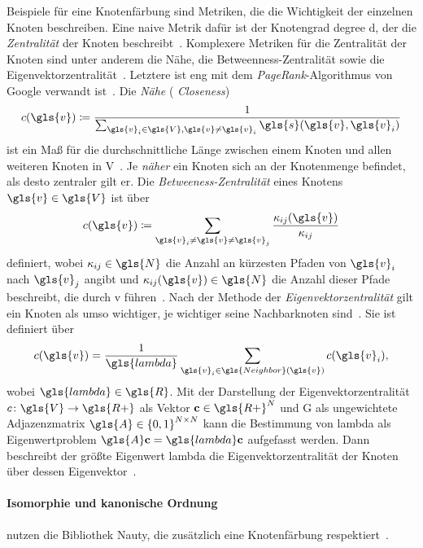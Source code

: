 Beispiele für eine Knotenfärbung sind Metriken, die die Wichtigkeit der einzelnen Knoten beschreiben.
Eine naive Metrik dafür ist \zB{} der Knotengrad \gls{degree} \bzw{} \gls{d}, der die \emph{Zentralität} der Knoten beschreibt~\cite{patchy}.
Komplexere Metriken für die Zentralität der Knoten sind unter anderem die Nähe, die Betweenness-Zentralität sowie die Eigenvektorzentralität~\cite{patchy, centrality}.
Letztere ist eng mit dem \emph{PageRank}-Algorithmus von Google verwandt ist~\cite{centrality}.
Die \emph{Nähe} (\engl{} \emph{Closeness})
\begin{equation*}
  c\left(\gls{v}\right) \coloneqq \frac{1}{\sum_{\gls{v}_i \in \gls{V}, \gls{v} \neq \gls{v}_i} \gls{s}\left(\gls{v}, \gls{v}_i\right)}
\end{equation*}
ist ein Maß für die durchschnittliche Länge zwischen einem Knoten und allen weiteren Knoten in \gls{V}~\cite{centrality}.
Je \emph{näher} ein Knoten sich an der Knotenmenge befindet, als desto zentraler gilt er.
Die \emph{Betweeness-Zentralität} eines Knotens $\gls{v} \in \gls{V}$ ist über
\begin{equation*}
  c\left(\gls{v}\right) \coloneqq \sum_{\gls{v}_i \neq \gls{v} \neq \gls{v}_j} \frac{\kappa_{ij}\left(\gls{v}\right)}{\kappa_{ij}}
\end{equation*}
definiert, wobei $\kappa_{ij} \in \gls{N}$ die Anzahl an kürzesten Pfaden von $\gls{v}_i$ nach $\gls{v}_j$ angibt und $\kappa_{ij}\left(\gls{v}\right) \in \gls{N}$ die Anzahl dieser Pfade beschreibt, die durch \gls{v} führen~\cite{centrality}.
Nach der Methode der \emph{Eigenvektorzentralität} gilt ein Knoten als umso wichtiger, je wichtiger seine Nachbarknoten sind~\cite{centrality}.
Sie ist definiert über
\begin{equation*}
  c\left(\gls{v}\right) = \frac{1}{\gls{lambda}} \sum_{\gls{v}_i \in \gls{Neighbor}\left(\gls{v}\right)} c\left(\gls{v}_i\right),
\end{equation*}
wobei $\gls{lambda} \in \gls{R}$.
Mit der Darstellung der Eigenvektorzentralität $c \colon \gls{V} \to \gls{R+}$ als Vektor $\ve{c} \in \gls{R+}^N$ und \gls{G} als ungewichtete Adjazenzmatrix $\gls{A} \in {\left\{0,1\right\}}^{N \times N}$ kann die Bestimmung von \gls{lambda} \bzw{}  als Eigenwertproblem $\gls{A}\ve{c} = \gls{lambda}\ve{c}$ aufgefasst werden.
Dann beschreibt der größte Eigenwert \gls{lambda} die Eigenvektorzentralität der Knoten über dessen Eigenvektor~\cite{centrality}.

\paragraph{Isomorphie und kanonische Ordnung}
\label{isomorphie_und_kanonische_ordnung}

\citeauthor{patchy} nutzen die Bibliothek Nauty, die zusätzlich eine Knotenfärbung respektiert~\cite{nauty}.



